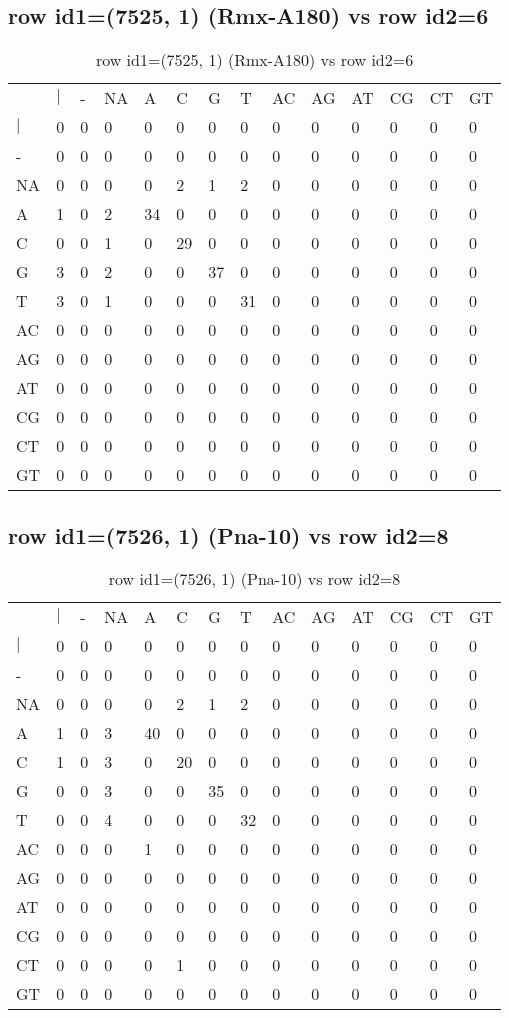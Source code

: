 \subsection{row id1=(7525, 1) (Rmx-A180) vs row id2=6}
\begin{center}
\begin{longtable}{|l|l|l|l|l|l|l|l|l|l|l|l|l|l|}
\caption{row id1=(7525, 1) (Rmx-A180) vs row id2=6} \label{table_dm340}\\
\hline
\\
\hline
&$|$&-&NA&A&C&G&T&AC&AG&AT&CG&CT&GT\\
$|$&0&0&0&0&0&0&0&0&0&0&0&0&0\\
-&0&0&0&0&0&0&0&0&0&0&0&0&0\\
NA&0&0&0&0&2&1&2&0&0&0&0&0&0\\
A&1&0&2&34&0&0&0&0&0&0&0&0&0\\
C&0&0&1&0&29&0&0&0&0&0&0&0&0\\
G&3&0&2&0&0&37&0&0&0&0&0&0&0\\
T&3&0&1&0&0&0&31&0&0&0&0&0&0\\
AC&0&0&0&0&0&0&0&0&0&0&0&0&0\\
AG&0&0&0&0&0&0&0&0&0&0&0&0&0\\
AT&0&0&0&0&0&0&0&0&0&0&0&0&0\\
CG&0&0&0&0&0&0&0&0&0&0&0&0&0\\
CT&0&0&0&0&0&0&0&0&0&0&0&0&0\\
GT&0&0&0&0&0&0&0&0&0&0&0&0&0\\
\hline
\end{longtable}
\end{center}

\subsection{row id1=(7526, 1) (Pna-10) vs row id2=8}
\begin{center}
\begin{longtable}{|l|l|l|l|l|l|l|l|l|l|l|l|l|l|}
\caption{row id1=(7526, 1) (Pna-10) vs row id2=8} \label{table_dm342}\\
\hline
\\
\hline
&$|$&-&NA&A&C&G&T&AC&AG&AT&CG&CT&GT\\
$|$&0&0&0&0&0&0&0&0&0&0&0&0&0\\
-&0&0&0&0&0&0&0&0&0&0&0&0&0\\
NA&0&0&0&0&2&1&2&0&0&0&0&0&0\\
A&1&0&3&40&0&0&0&0&0&0&0&0&0\\
C&1&0&3&0&20&0&0&0&0&0&0&0&0\\
G&0&0&3&0&0&35&0&0&0&0&0&0&0\\
T&0&0&4&0&0&0&32&0&0&0&0&0&0\\
AC&0&0&0&1&0&0&0&0&0&0&0&0&0\\
AG&0&0&0&0&0&0&0&0&0&0&0&0&0\\
AT&0&0&0&0&0&0&0&0&0&0&0&0&0\\
CG&0&0&0&0&0&0&0&0&0&0&0&0&0\\
CT&0&0&0&0&1&0&0&0&0&0&0&0&0\\
GT&0&0&0&0&0&0&0&0&0&0&0&0&0\\
\hline
\end{longtable}
\end{center}


